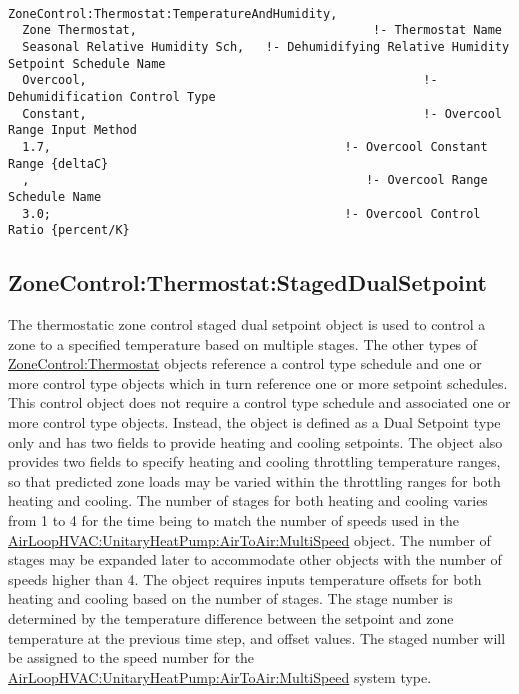 \begin{lstlisting}

ZoneControl:Thermostat:TemperatureAndHumidity,
  Zone Thermostat,                                 !- Thermostat Name
  Seasonal Relative Humidity Sch,   !- Dehumidifying Relative Humidity Setpoint Schedule Name
  Overcool,                                               !- Dehumidification Control Type
  Constant,                                               !- Overcool Range Input Method
  1.7,                                         !- Overcool Constant Range {deltaC}
  ,                                               !- Overcool Range Schedule Name
  3.0;                                         !- Overcool Control Ratio {percent/K}
\end{lstlisting}

\subsection{ZoneControl:Thermostat:StagedDualSetpoint}\label{zonecontrolthermostatstageddualsetpoint}

The thermostatic zone control staged dual setpoint object is used to control a zone to a specified temperature based on multiple stages. The other types of \hyperref[zonecontrolthermostat]{ZoneControl:Thermostat} objects reference a control type schedule and one or more control type objects which in turn reference one or more setpoint schedules. This control object does not require a control type schedule and associated one or more control type objects. Instead, the object is defined as a Dual Setpoint type only and has two fields to provide heating and cooling setpoints. The object also provides two fields to specify heating and cooling throttling temperature ranges, so that predicted zone loads may be varied within the throttling ranges for both heating and cooling. The number of stages for both heating and cooling varies from 1 to 4 for the time being to match the number of speeds used in the \hyperref[airloophvacunitaryheatpumpairtoairmultispeed]{AirLoopHVAC:UnitaryHeatPump:AirToAir:MultiSpeed} object. The number of stages may be expanded later to accommodate other objects with the number of speeds higher than 4. The object requires inputs temperature offsets for both heating and cooling based on the number of stages. The stage number is determined by the temperature difference between the setpoint and zone temperature at the previous time step, and offset values. The staged number will be assigned to the speed number for the \hyperref[airloophvacunitaryheatpumpairtoairmultispeed]{AirLoopHVAC:UnitaryHeatPump:AirToAir:MultiSpeed} system type.

